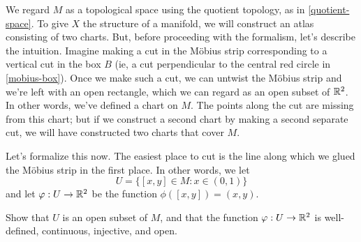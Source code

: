 \begin{figure}
\begin{center}
	\end{center}
\end{figure}

We regard $M$ as a topological space using the quotient topology, as in \cref{quotient-space}. To give $X$ the structure of a manifold, we will construct an atlas consisting of two charts. But, before proceeding with the formalism, let's describe the intuition. Imagine making a cut in the M\"obius strip corresponding to a vertical cut in the box $B$ (ie, a cut perpendicular to the central red circle in \cref{mobius-box}). Once we make such a cut, we can untwist the M\"obius strip and we're left with an open rectangle, which we can regard as an open subset of $\mathbb{R}^2$. In other words, we've defined a chart on $M$. The points along the cut are missing from this chart; but if we construct a second chart by making a second separate cut, we will have constructed two charts that cover $M$. 

Let's formalize this now. The easiest place to cut is the line along which we glued the M\"obius strip in the first place. In other words, we let \[ U = \{ [x, y] \in M : x \in (0,1) \} \] 
and let $\varphi : U \to \mathbb{R}^2$ be the function $\phi([x,y]) = (x, y)$.

\begin{exercise} \label{first-chart-mobius}
	Show that $U$ is an open subset of $M$, and that the function $\varphi : U \to \mathbb{R}^2$ is well-defined, continuous, injective, and open. 
\end{exercise}

